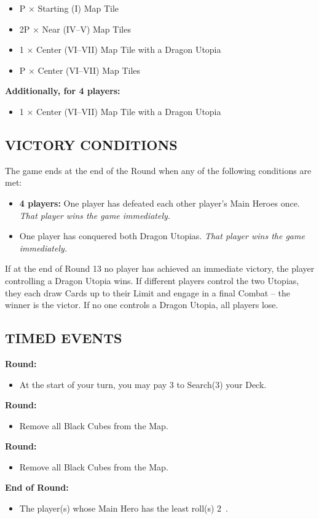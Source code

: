 \begin{multicols*}{2}
\begin{itemize}
  \item P × Starting (I) Map Tile
  \item 2P × Near (IV–V) Map Tiles
  \item 1 × Center (VI–VII) Map Tile with a Dragon Utopia
  \item P × Center (VI–VII) Map Tiles
\end{itemize}

\textbf{Additionally, for 4 players:}
\begin{itemize}
  \item 1 × Center (VI–VII) Map Tile with a Dragon Utopia
\end{itemize}

\subsection*{\MakeUppercase{Victory Conditions}}
The game ends at the end of the Round when any of the following conditions are met:

\begin{itemize}
 \item \textbf{4 players:} One player has defeated each other player's Main Heroes once. \textit{That player wins the game immediately.}
 \item One player has conquered both Dragon Utopias. \textit{That player wins the game immediately.}
\end{itemize}

If at the end of Round 13 no player has achieved an immediate victory, the player controlling a Dragon Utopia wins.
If different players control the two Utopias, they each draw Cards up to their  Limit and engage in a final Combat -- the winner is the victor.
If no one controls a Dragon Utopia, all players lose.
\subsection*{\MakeUppercase{Timed Events}}

\textbf{ Round:}
\begin{itemize}
  \item At the start of your turn, you may pay 3  to Search(3) your Deck.
\end{itemize}
\textbf{ Round:}
\begin{itemize}
  \item Remove all Black Cubes from the Map.
\end{itemize}
\textbf{ Round:}
\begin{itemize}
  \item Remove all Black Cubes from the Map.
\end{itemize}
\textbf{End of  Round:}
\begin{itemize}
  \item The player(s) whose Main Hero has the least  roll(s) 2~.
\end{itemize}


\end{multicols*}
